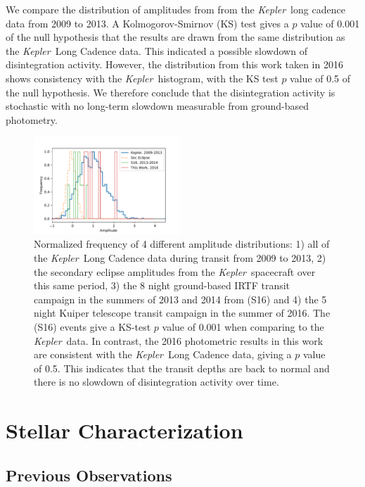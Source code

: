 \documentclass[preprint,trackchanges]{aastex61}
\newcommand{\kepler}{{\it Kepler}}
\begin{document}
We compare the distribution of amplitudes from \citet{schlawin2016kic1255} from the \kepler\ long cadence data from 2009 to 2013.
A Kolmogorov-Smirnov (KS) test gives a $p$ value of 0.001 of the null hypothesis that the \citet{schlawin2016kic1255} results are drawn from the same distribution as the \kepler\ Long Cadence data.
This indicated a possible slowdown of disintegration activity.
However, the distribution from this work taken in 2016 shows consistency with the \kepler\ histogram, with the KS test $p$ value of 0.5 of the null hypothesis. 
We therefore conclude that the disintegration activity is stochastic with no long-term slowdown measurable from ground-based photometry.

\begin{figure}[!hbtp]
\begin{centering}
\includegraphics[width=0.49\textwidth]{amp_distributions_comparison.pdf}
\caption{Normalized frequency of 4 different amplitude distributions: 1) all of the \kepler\ Long Cadence data during transit from 2009 to 2013, 2) the secondary eclipse amplitudes from the \kepler\ spacecraft over this same period, 3) the 8 night ground-based IRTF transit campaign in the summers of 2013 and 2014 from \citet{schlawin2016kic1255} (S16) and 4) the 5 night Kuiper telescope transit campaign in the summer of 2016.
The \citet{schlawin2016kic1255} (S16) events give a KS-test $p$ value of 0.001 when comparing to the \kepler\ data.
In contrast, the 2016 photometric results in this work are consistent with the \kepler\ Long Cadence data, giving a  $p$ value of 0.5.
This indicates that the transit depths are back to normal and there is no slowdown of disintegration activity over time.}\label{fig:histoPhot}
\end{centering}
\end{figure}

\section{Stellar Characterization}\label{sec:stellarCharacterization}
\subsection{Previous Observations}
\end{document}

